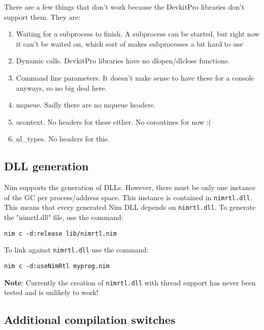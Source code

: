 There are a few things that don't work because the DevkitPro libraries
don't support them. They are:

\begin{enumerate}
\def\labelenumi{\arabic{enumi}.}
\tightlist
\item
  Waiting for a subprocess to finish. A subprocess can be started, but
  right now it can't be waited on, which sort of makes subprocesses a
  bit hard to use
\item
  Dynamic calls. DevkitPro libraries have no dlopen/dlclose functions.
\item
  Command line parameters. It doesn't make sense to have these for a
  console anyways, so no big deal here.
\item
  mqueue. Sadly there are no mqueue headers.
\item
  ucontext. No headers for these either. No coroutines for now :(
\item
  nl\_types. No headers for this.
\end{enumerate}

\hypertarget{dll-generation}{%
\subsection{DLL generation}\label{dll-generation}}

Nim supports the generation of DLLs. However, there must be only one
instance of the GC per process/address space. This instance is contained
in \texttt{nimrtl.dll}. This means that every generated Nim DLL depends
on \texttt{nimrtl.dll}. To generate the "nimrtl.dll" file, use the
command:

\begin{verbatim}
nim c -d:release lib/nimrtl.nim
\end{verbatim}

To link against \texttt{nimrtl.dll} use the command:

\begin{verbatim}
nim c -d:useNimRtl myprog.nim
\end{verbatim}

\textbf{Note}: Currently the creation of \texttt{nimrtl.dll} with thread
support has never been tested and is unlikely to work!

\hypertarget{additional-compilation-switches}{%
\subsection{Additional compilation
switches}\label{additional-compilation-switches}}

